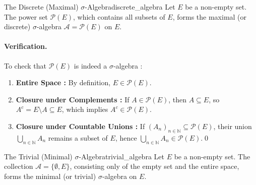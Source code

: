 

\begin{example}{The Discrete (Maximal) $\sigma$-Algebra}{discrete_algebra}
Let $E$ be a non-empty set. The power set $\mathcal{P}(E)$, which contains all subsets of $E$, forms the maximal (or discrete) $\sigma$-algebra $\mathcal{A} = \mathcal{P}(E)$ on $E$.
\end{example}

\paragraph{Verification.}
To check that $\mathcal{P}(E)$ is indeed a $\sigma$-algebra :
\begin{enumerate}[label=(\roman*)]
    \item \textbf{Entire Space :} By definition, $E \in \mathcal{P}(E)$.
    \item \textbf{Closure under Complements :} If $A \in \mathcal{P}(E)$, then $A \subseteq E$, so $A^c = E \setminus A \subseteq E$, which implies $A^c \in \mathcal{P}(E)$.
    \item \textbf{Closure under Countable Unions :} If $(A_n)_{n \in \mathbb{N}} \subseteq \mathcal{P}(E)$, their union $\bigcup_{n \in \mathbb{N}} A_n$ remains a subset of $E$, hence $\bigcup_{n \in \mathbb{N}} A_n \in \mathcal{P}(E)$.\qed
\end{enumerate}

\vspace{1em}


\begin{example}{The Trivial (Minimal) $\sigma$-Algebra}{trivial_algebra}
Let $E$ be a non-empty set. The collection $\mathcal{A} = \{\emptyset, E\}$, consisting only of the empty set and the entire space, forms the minimal (or trivial) $\sigma$-algebra on $E$.
\end{example}

